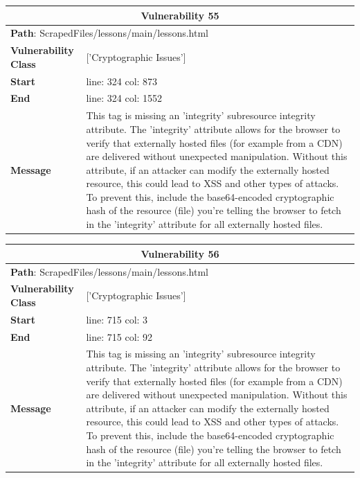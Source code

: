 \documentclass[12pt]{article}
\begin{document}
\vspace{0.7cm}
\FloatBarrier
\begin{table}[!h]
\centering
\renewcommand{\arraystretch}{1.3}
\begin{tabular}{|l|p{10cm}|}
\hline
\multicolumn{2}{|c|}{\textbf{Vulnerability 55}} \\
\hline
\multicolumn{2}{|l|}{\textbf{Path}: ScrapedFiles/lessons/main/lessons.html} \\
\hline
\textbf{Vulnerability Class} & ['Cryptographic Issues'] \\
\hline
\textbf{Start} & line: 324 \quad col: 873 \\
\hline
\textbf{End} & line: 324 \quad col: 1552 \\
\hline
\textbf{Message} & This tag is missing an 'integrity' subresource integrity attribute. The 'integrity' attribute allows for the browser to verify that externally hosted files (for example from a CDN) are delivered without unexpected manipulation. Without this attribute, if an attacker can modify the externally hosted resource, this could lead to XSS and other types of attacks. To prevent this, include the base64-encoded cryptographic hash of the resource (file) you're telling the browser to fetch in the 'integrity' attribute for all externally hosted files. \\
\hline
\end{tabular}
\end{table}
\vspace{0.7cm}
\FloatBarrier
\begin{table}[!h]
\centering
\renewcommand{\arraystretch}{1.3}
\begin{tabular}{|l|p{10cm}|}
\hline
\multicolumn{2}{|c|}{\textbf{Vulnerability 56}} \\
\hline
\multicolumn{2}{|l|}{\textbf{Path}: ScrapedFiles/lessons/main/lessons.html} \\
\hline
\textbf{Vulnerability Class} & ['Cryptographic Issues'] \\
\hline
\textbf{Start} & line: 715 \quad col: 3 \\
\hline
\textbf{End} & line: 715 \quad col: 92 \\
\hline
\textbf{Message} & This tag is missing an 'integrity' subresource integrity attribute. The 'integrity' attribute allows for the browser to verify that externally hosted files (for example from a CDN) are delivered without unexpected manipulation. Without this attribute, if an attacker can modify the externally hosted resource, this could lead to XSS and other types of attacks. To prevent this, include the base64-encoded cryptographic hash of the resource (file) you're telling the browser to fetch in the 'integrity' attribute for all externally hosted files. \\
\hline
\end{tabular}
\end{table}
\end{document}
